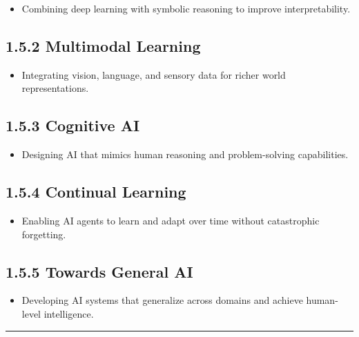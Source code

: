 \documentclass[
]{book}
\providecommand{\tightlist}{%
  \setlength{\itemsep}{0pt}\setlength{\parskip}{0pt}}
\begin{document}
\begin{itemize}
\tightlist
\item
  Combining deep learning with symbolic reasoning to improve interpretability.
\end{itemize}

\subsection{1.5.2 Multimodal Learning}\label{multimodal-learning}

\begin{itemize}
\tightlist
\item
  Integrating vision, language, and sensory data for richer world representations.
\end{itemize}

\subsection{1.5.3 Cognitive AI}\label{cognitive-ai}

\begin{itemize}
\tightlist
\item
  Designing AI that mimics human reasoning and problem-solving capabilities.
\end{itemize}

\subsection{1.5.4 Continual Learning}\label{continual-learning}

\begin{itemize}
\tightlist
\item
  Enabling AI agents to learn and adapt over time without catastrophic forgetting.
\end{itemize}

\subsection{1.5.5 Towards General AI}\label{towards-general-ai}

\begin{itemize}
\tightlist
\item
  Developing AI systems that generalize across domains and achieve human-level intelligence.
\end{itemize}

\begin{center}\rule{0.5\linewidth}{0.5pt}\end{center}
\end{document}

